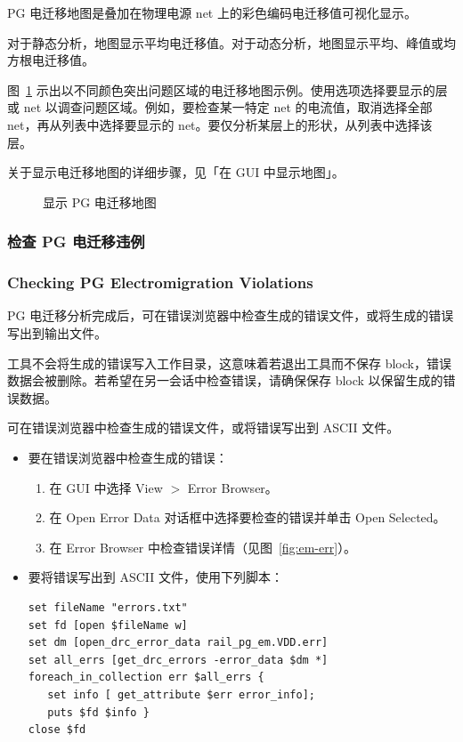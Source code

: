 PG 电迁移地图是叠加在物理电源 net 上的彩色编码电迁移值可视化显示。

对于静态分析，地图显示平均电迁移值。对于动态分析，地图显示平均、峰值或均方根电迁移值。

图~\ref{fig:em-map} 示出以不同颜色突出问题区域的电迁移地图示例。使用选项选择要显示的层或 net 以调查问题区域。例如，要检查某一特定 net 的电流值，取消选择全部 net，再从列表中选择要显示的 net。要仅分析某层上的形状，从列表中选择该层。

关于显示电迁移地图的详细步骤，见「在 GUI 中显示地图」。

\begin{figure}[htbp]
\centering
{}
\caption{显示 PG 电迁移地图}
\label{fig:em-map}
\end{figure}

\subsubsection{检查 PG 电迁移违例}
\subsubsection*{Checking PG Electromigration Violations}

PG 电迁移分析完成后，可在错误浏览器中检查生成的错误文件，或将生成的错误写出到输出文件。

工具不会将生成的错误写入工作目录，这意味着若退出工具而不保存 block，错误数据会被删除。若希望在另一会话中检查错误，请确保保存 block 以保留生成的错误数据。

可在错误浏览器中检查生成的错误文件，或将错误写出到 ASCII 文件。

\begin{itemize}
  \item 要在错误浏览器中检查生成的错误：
    \begin{enumerate}
      \item 在 GUI 中选择 View $>$ Error Browser。
      \item 在 Open Error Data 对话框中选择要检查的错误并单击 Open Selected。
      \item 在 Error Browser 中检查错误详情（见图~\ref{fig:em-err}）。
    \end{enumerate}
  \item 要将错误写出到 ASCII 文件，使用下列脚本：
\begin{lstlisting}
set fileName "errors.txt"
set fd [open $fileName w]
set dm [open_drc_error_data rail_pg_em.VDD.err]
set all_errs [get_drc_errors -error_data $dm *]
foreach_in_collection err $all_errs {
   set info [ get_attribute $err error_info];
   puts $fd $info }
close $fd
\end{lstlisting}
\end{itemize}

